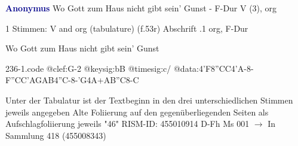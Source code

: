 \documentclass[twocolumn]{book}
\begin{document}
\newline \par \vspace{7pt} \textcolor{darkblue}{\textbf{Anonymus  }}
\newline Wo Gott zum Haus nicht gibt sein' Gunst - F-Dur
\newline V (3), org
\newline \begin{itshape}\end{itshape} 
\newline \textcolor{darkblue}{}  1 Stimmen: V and org (tabulature)  (f.53r)
\newline Abschrift
.1  org, F-Dur
\newline \begin{footnotesize} Wo Gott zum Haus nicht gibt sein' Gunst \end{footnotesize}  
\begin{filecontents*}{236-1.code}
@clef:G-2
@keysig:bB
@timesig:c/
@data:4'F{8''CC}4'A-8-F{''CC}{'AGAB}4''C-8-'G4A+AB''C8-C
\end{filecontents*}
\newline
%
\newline Unter der Tabulatur ist der Textbeginn in den drei unterschiedlichen Stimmen jeweils angegeben
\newline Alte Foliierung auf den gegenüberliegenden Seiten als Aufschlagfoliierung jeweils "46"
\newline RISM-ID: 455010914
\newline D-Fh  Ms 001
\newline $\rightarrow$ In Sammlung 418 (455008343)
      
\end{document}
